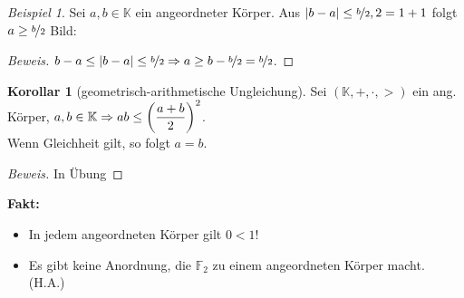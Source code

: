 \documentclass[12pt,a4paper,titlepage]{article} %
\theoremstyle{definition}
\newtheorem{kor}[satz]{Korollar}
\theoremstyle{remark}
\newtheorem*{bsp}{Beispiel}
\newenvironment{bew}{\begin{proof}[Beweis]}{\end{proof}}
\begin{document}
\begin{bsp}
	Sei $a,b\in\mathbb{K}$ ein angeordneter Körper. Aus $|b-a|\leq \nicefrac{b}{2}, 2 = 1+1$ folgt $a \geq \nicefrac{b}{2}$
	Bild: %
	\begin{bew}
		$b-a \leq |b-a| \leq \nicefrac{b}{2} \Rightarrow a \geq b - \nicefrac{b}{2} = \nicefrac{b}{2}$.
	\end{bew}
\end{bsp}
\begin{kor}[\glqq geometrisch-arithmetische Ungleichung\grqq]
	Sei $(\mathbb{K},+,\cdot,>)$ ein ang. Körper, $a,b\in\mathbb{K}\\
	\Rightarrow ab \leq \left( \dfrac{a+b}{2}\right)^2$.\\
	Wenn Gleichheit gilt, so folgt $a=b$.
\end{kor}
\begin{bew}
	In Übung
\end{bew}
\textbf{Fakt:}
\begin{itemize}
	\item In jedem angeordneten Körper gilt $0<1$!
	\item Es gibt keine Anordnung, die $\mathbb{F}_2$ zu einem angeordneten Körper macht. (H.A.)
\end{itemize}
\end{document}
